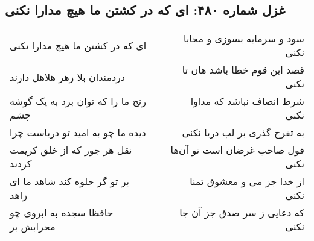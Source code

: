 \begin{center}
\section*{غزل شماره ۴۸۰: ای که در کشتن ما هیچ مدارا نکنی}
\label{sec:sh480}
\begin{longtable}{l p{0.5cm} r}
ای که در کشتن ما هیچ مدارا نکنی
&&
سود و سرمایه بسوزی و محابا نکنی
\\
دردمندان بلا زهر هلاهل دارند
&&
قصد این قوم خطا باشد هان تا نکنی
\\
رنج ما را که توان برد به یک گوشه چشم
&&
شرط انصاف نباشد که مداوا نکنی
\\
دیده ما چو به امید تو دریاست چرا
&&
به تفرج گذری بر لب دریا نکنی
\\
نقل هر جور که از خلق کریمت کردند
&&
قول صاحب غرضان است تو آن‌ها نکنی
\\
بر تو گر جلوه کند شاهد ما ای زاهد
&&
از خدا جز می و معشوق تمنا نکنی
\\
حافظا سجده به ابروی چو محرابش بر
&&
که دعایی ز سر صدق جز آن جا نکنی
\\
\end{longtable}
\end{center}
